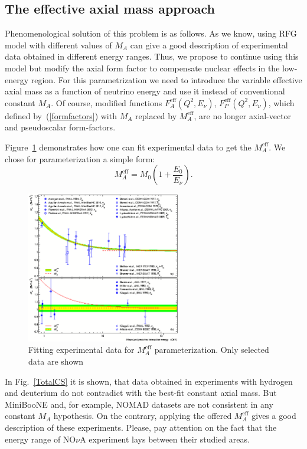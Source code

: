\subsection{The effective axial mass approach}
Phenomenological solution of this problem is as follows. As we know, using RFG model with different values of $M_{A}$ can give a good description of experimental data obtained in different energy ranges. Thus, we propose to continue using this model but modify the axial form factor to compensate nuclear effects in the low-energy region. For this parametrization we need to introduce the variable effective axial mass as a function of neutrino energy and use it instead of conventional constant $M_{A}$. Of course, modified functions $F_{A}^\mathrm{eff}(Q^{2},E_{\nu})$, $F_{P}^\mathrm{eff}(Q^{2},E_{\nu})$, which defined by~(\ref{formfactors}) with $M_{A}$ replaced by $M_{A}^\mathrm{eff}$, are no longer axial-vector and pseudoscalar form-factors.

Figure~\ref{MA_QES_eff} demonstrates how one can fit experimental data to get the $M_{A}^\mathrm{eff}$. We chose for parameterization a simple form:
\begin{equation}
M_{A}^\mathrm{eff}=M_{0}\left(1+\frac{E_{0}}{E_{\nu}}\right).
\end{equation}

\begin{figure}[htb!]
\begin{center}
\includegraphics[width=0.6\textwidth]{./QES/MA_QES_eff.eps}
\caption{\label{MA_QES_eff}Fitting experimental data for $M_{A}^\mathrm{eff}$ parameterization. Only selected data are shown}
\end{center}
\end{figure}

In Fig.~\ref{TotalCS} it is shown, that data obtained in experiments with hydrogen and deuterium do not contradict with the best-fit constant axial mass. But MiniBooNE and, for example, NOMAD datasets are not consistent in any constant $M_{A}$ hypothesis. On the contrary, applying the offered $M_{A}^\mathrm{eff}$ gives a good description of these experiments. Please, pay attention on the fact that the energy range of NO$\nu$A experiment lays between their studied areas.
